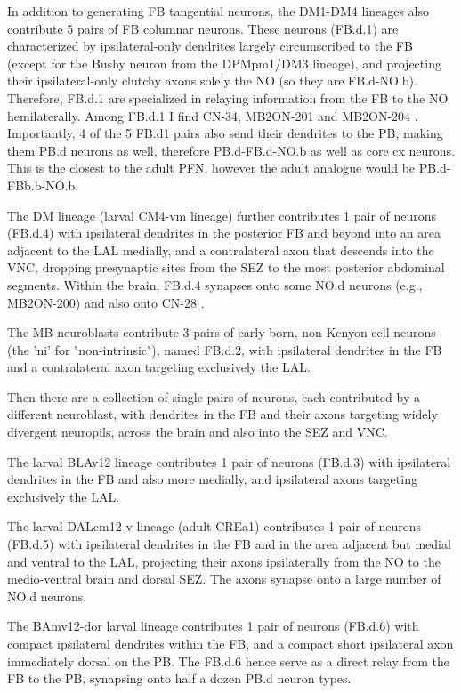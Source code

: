     In addition to generating FB tangential neurons, the DM1-DM4 lineages also contribute 5 pairs of FB columnar neurons. These neurons (FB.d.1) are characterized by ipsilateral-only dendrites largely circumscribed to the FB (except for the Bushy neuron from the DPMpm1/DM3 lineage), and projecting their ipsilateral-only clutchy axons solely the NO (so they are FB.d-NO.b). Therefore, FB.d.1 are specialized in relaying information from the FB to the NO hemilaterally. Among FB.d.1 I find CN-34, MB2ON-201 and MB2ON-204 \citep{eschbach2021circuits}. Importantly, 4 of the 5 FB.d1 pairs also send their dendrites to the PB, making them PB.d neurons as well, therefore PB.d-FB.d-NO.b as well as core cx neurons. This is the closest to the adult PFN, however the adult analogue would be PB.d-FBb.b-NO.b. %



    The DM lineage (larval CM4-vm lineage) further contributes 1 pair of neurons (FB.d.4) with ipsilateral dendrites in the posterior FB and beyond into an area adjacent to the LAL medially, and a contralateral axon that descends into the VNC, dropping presynaptic sites from the SEZ to the most posterior abdominal segments. Within the brain, FB.d.4 synapses onto some NO.d neurons (e.g., MB2ON-200) and also onto CN-28 \citep{eschbach2021circuits}.

    The MB neuroblasts contribute 3 pairs of early-born, non-Kenyon cell neurons (the 'ni' for "non-intrinsic"), named FB.d.2, with ipsilateral dendrites in the FB and a contralateral axon targeting exclusively the LAL.

    Then there are a collection of single pairs of neurons, each contributed by a different neuroblast, with dendrites in the FB and their axons targeting widely divergent neuropils, across the brain and also into the SEZ and VNC.

    The larval BLAv12 lineage contributes 1 pair of neurons (FB.d.3) with ipsilateral dendrites in the FB and also more medially, and ipsilateral axons targeting exclusively the LAL.

    The larval DALcm12-v lineage (adult CREa1) contributes 1 pair of neurons (FB.d.5) with ipsilateral dendrites in the FB and in the area adjacent but medial and ventral to the LAL, projecting their axons ipsilaterally from the NO to the medio-ventral brain and dorsal SEZ. The axons synapse onto a large number of NO.d neurons.

    The BAmv12-dor larval lineage contributes 1 pair of neurons (FB.d.6) with compact ipsilateral dendrites within the FB, and a compact short ipsilateral axon immediately dorsal on the PB. The FB.d.6 hence serve as a direct relay from the FB to the PB, synapsing onto half a dozen PB.d neuron types.

